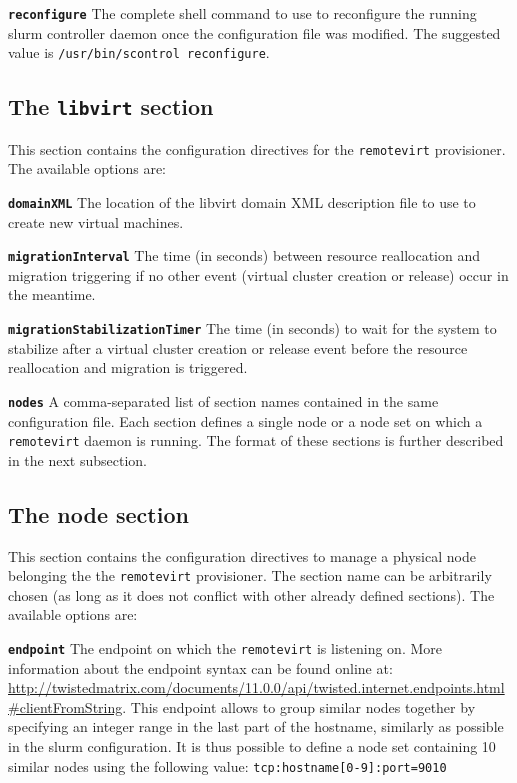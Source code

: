 \textbf{\texttt{reconfigure}} The complete shell command to use to reconfigure the running \gls{slurm} controller daemon once the configuration file was modified. The suggested value is \texttt{/usr/bin/scontrol reconfigure}.

\subsection{The \texttt{libvirt} section}

This section contains the configuration directives for the \texttt{remotevirt} provisioner. The available options are:

\textbf{\texttt{domainXML}} The location of the libvirt domain XML description file to use to create new virtual machines.

\textbf{\texttt{migrationInterval}} The time (in seconds) between resource reallocation and migration triggering if no other event (virtual cluster creation or release) occur in the meantime.

\textbf{\texttt{migrationStabilizationTimer}} The time (in seconds) to wait for the system to stabilize after a virtual cluster creation or release event before the resource reallocation and migration is triggered.

\textbf{\texttt{nodes}} A comma-separated list of section names contained in the same configuration file. Each section defines a single node or a node set on which a \texttt{remotevirt} daemon is running. The format of these sections is further described in the next subsection.

\subsection{The node section}

This section contains the configuration directives to manage a physical node belonging the the \texttt{remotevirt} provisioner. The section name can be arbitrarily chosen (as long as it does not conflict with other already defined sections). The available options are:

\textbf{\texttt{endpoint}} The endpoint on which the \texttt{remotevirt} is listening on. More information about the endpoint syntax can be found online at: \url{http://twistedmatrix.com/documents/11.0.0/api/twisted.internet.endpoints.html#clientFromString}. This endpoint allows to group similar nodes together by specifying an integer range in the last part of the hostname, similarly as possible in the \gls{slurm} configuration. It is thus possible to define a node set containing 10 similar nodes using the following value: \texttt{tcp:hostname[0-9]:port=9010}

